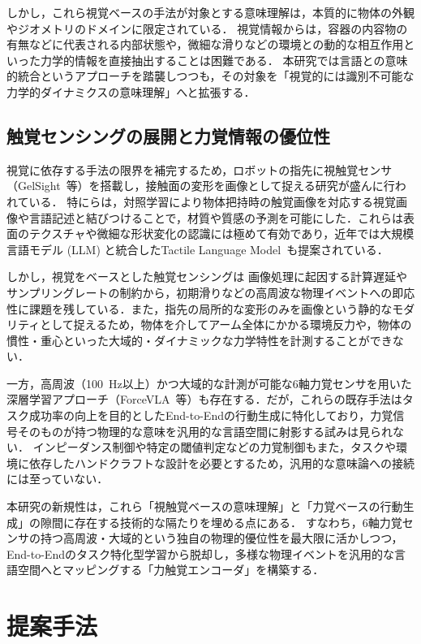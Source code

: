 \documentclass[Japanese]{dicomopapers}
\begin{document}
しかし，これら視覚ベースの手法が対象とする意味理解は，本質的に物体の外観やジオメトリのドメインに限定されている．
視覚情報からは，容器の内容物の有無などに代表される内部状態や，微細な滑りなどの環境との動的な相互作用といった力学的情報を直接抽出することは困難である．
本研究では言語との意味的統合というアプローチを踏襲しつつも，その対象を「視覚的には識別不可能な力学的ダイナミクスの意味理解」へと拡張する．

\subsection{触覚センシングの展開と力覚情報の優位性}
視覚に依存する手法の限界を補完するため，ロボットの指先に視触覚センサ（GelSight~\cite{GelSight}等）を搭載し，接触面の変形を画像として捉える研究が盛んに行われている．
特に\cite{CLTP, BindingTouch, MMWand}らは，対照学習により物体把持時の触覚画像を対応する視覚画像や言語記述と結びつけることで，材質や質感の予測を可能にした．これらは表面のテクスチャや微細な形状変化の認識には極めて有効であり，近年では大規模言語モデル (LLM) と統合したTactile Language Model~\cite{yu2024octopi}も提案されている．

しかし，視覚をベースとした触覚センシングは
画像処理に起因する計算遅延やサンプリングレートの制約から，初期滑りなどの高周波な物理イベントへの即応性に課題を残している．また，指先の局所的な変形のみを画像という静的なモダリティとして捉えるため，物体を介してアーム全体にかかる環境反力や，物体の慣性・重心といった大域的・ダイナミックな力学特性を計測することができない．

一方，高周波（\qty{100}{\Hz}以上）かつ大域的な計測が可能な6軸力覚センサを用いた深層学習アプローチ（ForceVLA~\cite{ForceVLA}等）も存在する．だが，これらの既存手法はタスク成功率の向上を目的としたEnd-to-Endの行動生成に特化しており，力覚信号そのものが持つ物理的な意味を汎用的な言語空間に射影する試みは見られない．
インピーダンス制御や特定の閾値判定などの力覚制御もまた，タスクや環境に依存したハンドクラフトな設計を必要とするため，汎用的な意味論への接続には至っていない．

本研究の新規性は，これら「視触覚ベースの意味理解」と「力覚ベースの行動生成」の隙間に存在する技術的な隔たりを埋める点にある．
すなわち，6軸力覚センサの持つ高周波・大域的という独自の物理的優位性を最大限に活かしつつ，End-to-Endのタスク特化型学習から脱却し，多様な物理イベントを汎用的な言語空間へとマッピングする「力触覚エンコーダ」を構築する．


\section{提案手法}
\end{document}
